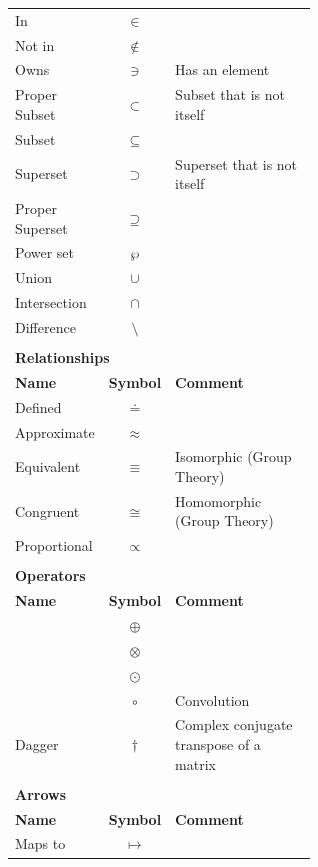 \documentclass[12pt, english]{book}
\begin{document}
\begin{tabularx}{\textwidth}{ l c p{0.6\linewidth}}
 		In 						& $\in$ 			& \\
 		Not in 					& $\nin$			& \\
 		Owns 					& $\ni$				& Has an element \\
 		
 		Proper Subset 			& $\subset$			& Subset that is not itself \\
 		Subset 					& $\subseteq$		& \\
 		Superset 				& $\supset$ 		& Superset that is not itself\\
 		Proper Superset 		& $\supseteq$		& \\
 		Power set				& $\wp$				& \\
 		Union 					& $\cup$			& \\
 		Intersection			& $\cap$			& \\
 		Difference				& $\setminus$		& \\
 		\hline
 		
 		& & \\
 		\multicolumn{3}{l}{\textbf{{\large Relationships}}} \\ [10pt]
 		\hline
 		\textbf{Name} & \textbf{Symbol} & \textbf{Comment} \\
 		\hline
 		Defined 				& $\doteq$ 			& \\
 		Approximate 			& $\approx$			& \\
 		Equivalent				& $\equiv$	 		& Isomorphic (Group Theory) \\
 		Congruent 				& $\cong$			& Homomorphic (Group Theory) \\
 		Proportional 			& $\propto$			& \\
 		\hline
 		
 		& & \\
 		\multicolumn{3}{l}{\textbf{{\large Operators}}} \\ [10pt]
 		\hline
 		\textbf{Name} & \textbf{Symbol} & \textbf{Comment} \\
 		\hline
 		& $\oplus$ & \\
 		& $\otimes$ & \\
 		& $\odot$ & \\
 		& $\circ$ & Convolution \\
 		Dagger& $\dagger$ & Complex conjugate transpose of a matrix \\
 		\hline
 		
 		& & \\
 		\multicolumn{3}{l}{\textbf{{\large Arrows}}} \\ [10pt]
 		\hline
 		\textbf{Name} & \textbf{Symbol} & \textbf{Comment} \\
 		\hline
 		Maps to 				& $\mapsto$			& \\
 		\hline
 		

\end{tabularx}
\end{document}

